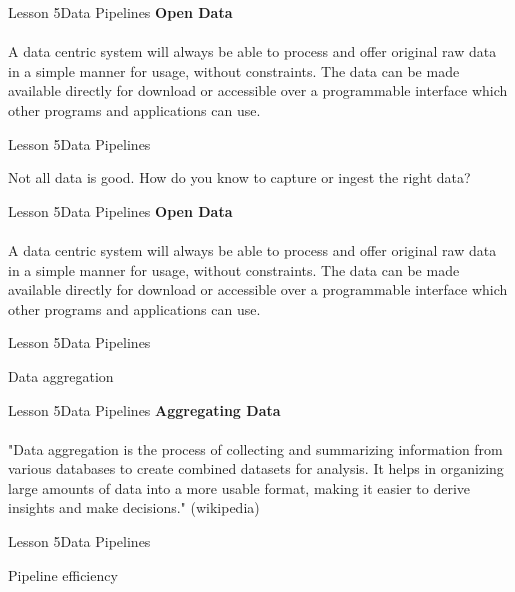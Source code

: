 \documentclass[aspectratio=1610]{beamer}
\begin{document}
\begin{frame}{Lesson 5}{Data Pipelines}
\LARGE
\textbf{Open Data}\\~\\
A data centric system will always be able to process and offer 
original raw data in a simple manner for usage, without constraints. 
The data can be made available directly for download or accessible 
over a programmable interface which other programs and applications 
can use.
\end{frame}




\begin{frame}{Lesson 5}{Data Pipelines}
\Huge
\begin{center}
Not all data is good. How do you know to capture or ingest the right 
data? 
\end{center}
\end{frame}


\begin{frame}{Lesson 5}{Data Pipelines}
\LARGE
\textbf{Open Data}\\~\\
A data centric system will always be able to process and offer 
original raw data in a simple manner for usage, without constraints. 
The data can be made available directly for download or accessible 
over a programmable interface which other programs and applications 
can use.
\end{frame}


\begin{frame}{Lesson 5}{Data Pipelines}
\Huge
\begin{center}
Data aggregation
\end{center}
\end{frame}



\begin{frame}{Lesson 5}{Data Pipelines}
\LARGE
\textbf{Aggregating Data}\\~\\
"Data aggregation is the process of collecting and summarizing 
information from various databases to create combined datasets for 
analysis. It helps in organizing large amounts of data into a more 
usable format, making it easier to derive insights and make 
decisions." (wikipedia)
\end{frame}



\begin{frame}{Lesson 5}{Data Pipelines}
\Huge
\begin{center}
Pipeline efficiency
\end{center}
\end{frame}
\end{document}
